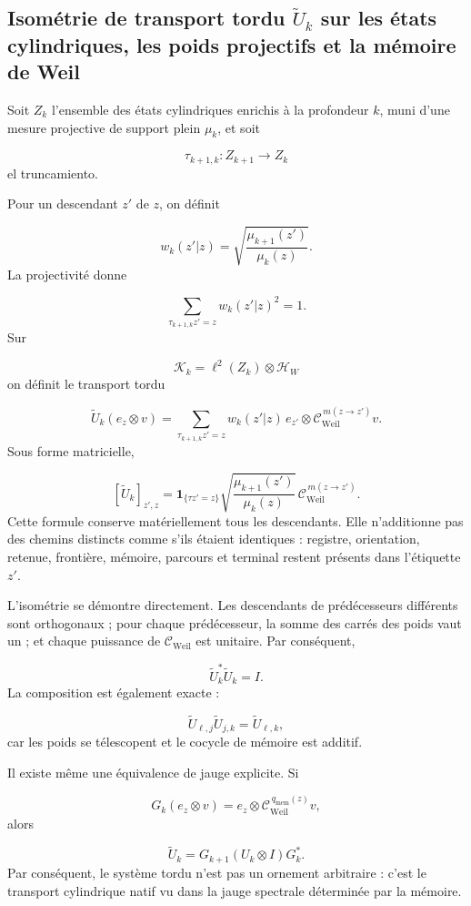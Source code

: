\subsection{Isométrie de transport tordu \(\widetilde U_k\) sur les états cylindriques, les poids projectifs et la mémoire de Weil}
Soit \(Z_k\) l'ensemble des états cylindriques enrichis à la profondeur \(k\), muni d'une mesure projective de support plein \(\mu_k\), et soit\par
\[
\tau_{k+1,k}:Z_{k+1}\longrightarrow Z_k
\]
el truncamiento.\par
Pour un descendant \(z'\) de \(z\), on définit\par
\[
w_k(z'|z)
=
\sqrt{\frac{\mu_{k+1}(z')}{\mu_k(z)}}.
\]
La projectivité donne\par
\[
\sum_{\tau_{k+1,k}z'=z}w_k(z'|z)^2=1.
\]
Sur\par
\[
\mathscr K_k
=
\ell^2(Z_k)\otimes\mathcal H_W
\]
on définit le transport tordu\par
\[
\widetilde U_k(e_z\otimes v)
=
\sum_{\tau_{k+1,k}z'=z}
w_k(z'|z)\,
e_{z'}\otimes
\mathcal C_{\mathrm{Weil}}^{\,m(z\to z')}v.
\]
Sous forme matricielle,\par
\[
[\widetilde U_k]_{z',z}
=
\mathbf 1_{\{\tau z'=z\}}
\sqrt{\frac{\mu_{k+1}(z')}{\mu_k(z)}}
\,
\mathcal C_{\mathrm{Weil}}^{\,m(z\to z')}.
\]
Cette formule conserve matériellement tous les descendants. Elle n'additionne pas des chemins distincts comme s'ils étaient identiques : registre, orientation, retenue, frontière, mémoire, parcours et terminal restent présents dans l'étiquette \(z'\).\par
L'isométrie se démontre directement. Les descendants de prédécesseurs différents sont orthogonaux ; pour chaque prédécesseur, la somme des carrés des poids vaut un ; et chaque puissance de \(\mathcal C_{\mathrm{Weil}}\) est unitaire. Par conséquent,\par
\[
\widetilde U_k^*\widetilde U_k=I.
\]
La composition est également exacte :\par
\[
\widetilde U_{\ell,j}\widetilde U_{j,k}
=
\widetilde U_{\ell,k},
\]
car les poids se télescopent et le cocycle de mémoire est additif.\par
Il existe même une équivalence de jauge explicite. Si\par
\[
G_k(e_z\otimes v)
=
e_z\otimes
\mathcal C_{\mathrm{Weil}}^{\,q_{\mathrm{mem}}(z)}v,
\]
alors\par
\[
\widetilde U_k
=
G_{k+1}(U_k\otimes I)G_k^*.
\]
Par conséquent, le système tordu n'est pas un ornement arbitraire : c'est le transport cylindrique natif vu dans la jauge spectrale déterminée par la mémoire.\par
